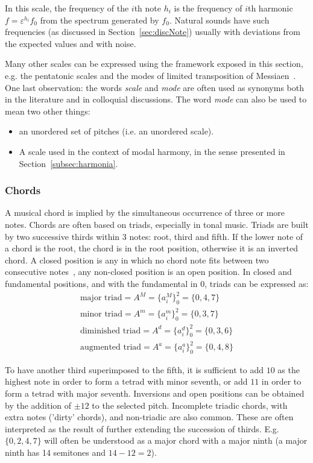 In this scale, the frequency of the $i$th note $h_i$ is the frequency of $i$th harmonic $f=\varepsilon^{h_i} f_0$ from the spectrum generated by $f_0$. Natural sounds have such frequencies (as discussed in Section~\ref{sec:discNote}) usually with deviations from the expected values and with noise.

Many other scales can be expressed using the framework exposed in this section, e.g. the pentatonic scales and the modes of limited transposition of Messiaen~\cite{Messiaen}.
One last observation: the words \emph{scale} and \emph{mode} are often used as synonyms both in the literature and in colloquial discussions.
The word \emph{mode} can also be used to mean two other things:
\begin{itemize}
	\item an unordered set of pitches (i.e. an unordered scale).
	\item A scale used in the context of modal harmony, in the sense presented in Section~\ref{subsec:harmonia}.
\end{itemize}

\subsubsection{Chords}\label{subsec:acordes}
A musical chord is implied by the simultaneous occurrence of three or more notes. Chords are often based on triads, especially in tonal music. Triads are built by two successive thirds
within 3 notes: root, third and fifth. If the lower note of a chord is the root, the chord is in the root position, otherwise it is an inverted chord. A closed position is any in which no chord note fits between two consecutive
notes~\cite{Lacerda}, any non-closed position is an open position. In closed and fundamental positions,
and with the fundamental in $0$, triads can be expressed as:
\begin{equation}\label{triades}
\begin{split}
\text{major triad} = A^M= \{a_i^M\}_0^2=\{0,4,7\} \\ 
\text{minor triad} = A^m = \{a_i^m\}_0^2=\{0,3,7\} \\
\text{diminished triad} = A^d = \{a_i^d\}_0^2=\{0,3,6\} \\
\text{augmented triad} =  A^a = \{a_i^a\}_0^2=\{0,4,8\}
\end{split}
\end{equation}

To have another third superimposed to the fifth, it is sufficient to add $10$ as the highest note in order to form a tetrad with minor seventh, or add $11$ in order to form a tetrad with major
seventh. Inversions and open positions can be obtained by the 
addition of $\pm 12$ to the selected pitch. Incomplete triadic chords, with extra notes ('dirty' chords), and non-triadic
are also common.
These are often interpreted as the result of further extending the succession of thirds.
E.g. $\{0,2,4,7\}$ will often be understood as a major chord with a major ninth (a major ninth has 14 semitones and $14-12 = 2$).


